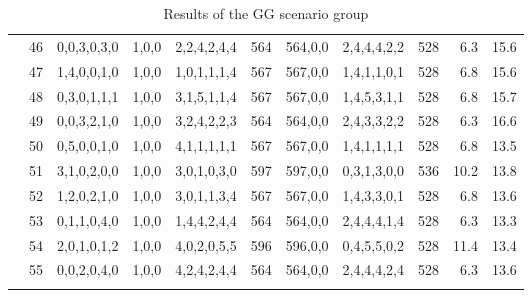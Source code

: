 \documentclass[review,12pt, 3p, times]{elsarticle}
\begin{document}
\begin{longtable}{|c|c|c|c|c|c|c|c|c|r|c|}
    & 46 & 0,0,3,0,3,0 & 1,0,0 &2,2,4,2,4,4 & 564 & 564,0,0 & 2,4,4,4,2,2 & 528 & 6.3  & 15.6 \\
    & 47 & 1,4,0,0,1,0 & 1,0,0 &1,0,1,1,1,4 & 567 & 567,0,0 & 1,4,1,1,0,1 & 528 & 6.8  & 15.6 \\
    & 48 & 0,3,0,1,1,1 & 1,0,0 &3,1,5,1,1,4 & 567 & 567,0,0 & 1,4,5,3,1,1 & 528 & 6.8  & 15.7 \\
    & 49 & 0,0,3,2,1,0 & 1,0,0 &3,2,4,2,2,3 & 564 & 564,0,0 & 2,4,3,3,2,2 & 528 & 6.3  & 16.6 \\
    & 50 & 0,5,0,0,1,0 & 1,0,0 &4,1,1,1,1,1 & 567 & 567,0,0 & 1,4,1,1,1,1 & 528 & 6.8  & 13.5 \\
    & 51 & 3,1,0,2,0,0 & 1,0,0 &3,0,1,0,3,0 & 597 & 597,0,0 & 0,3,1,3,0,0 & 536 & 10.2 & 13.8 \\
    & 52 & 1,2,0,2,1,0 & 1,0,0 &3,0,1,1,3,4 & 567 & 567,0,0 & 1,4,3,3,0,1 & 528 & 6.8  & 13.6 \\
    & 53 & 0,1,1,0,4,0 & 1,0,0 &1,4,4,2,4,4 & 564 & 564,0,0 & 2,4,4,4,1,4 & 528 & 6.3  & 13.3\\
    & 54 & 2,0,1,0,1,2 & 1,0,0 &4,0,2,0,5,5 & 596 & 596,0,0 & 0,4,5,5,0,2 & 528 & 11.4 & 13.4 \\
    & 55 & 0,0,2,0,4,0 & 1,0,0 &4,2,4,2,4,4 & 564 & 564,0,0 & 2,4,4,4,2,4 & 528 & 6.3  & 13.6 \\
	\hline
	\hline
	\caption{Results of the GG scenario group} 
	\label{tab:tr_gg}
\end{longtable}
\end{document}
